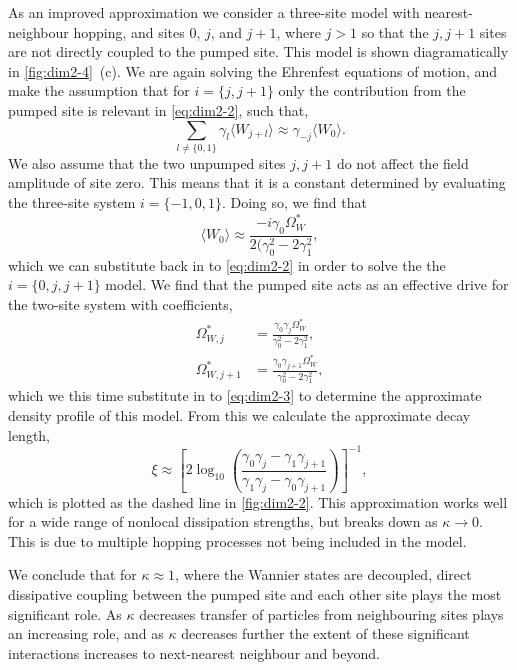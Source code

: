 As an improved approximation we consider a three-site model with nearest-neighbour hopping, and sites 0, \(j\), and \(j+1\), where \(j > 1\) so that the \(j,j+1\) sites are not directly coupled to the pumped site. This model is shown diagramatically in \cref{fig:dim2-4}~(c). We are again solving the Ehrenfest equations of motion, and make the assumption that for \(i=\{j,j+1\}\) only the contribution from the pumped site is relevant in \cref{eq:dim2-2}, such that,
\begin{equation}
	\sum_{l \neq \{0,1\}} \gamma_{l} \langle W_{j+l} \rangle \approx \gamma_{-j} \langle W_{0} \rangle.
	\label{eq:dim2-15}
\end{equation}
We also assume that the two unpumped sites \(j, j+1\) do not affect the field amplitude of site zero. This means that it is a constant determined by evaluating the three-site system \(i=\{-1,0,1\}\). Doing so, we find that
\begin{equation}
	\langle W_{0} \rangle \approx \frac{-i\gamma_{0}\Omega_{W}^{*}}{2(\gamma_{0}^{2} - 2\gamma_{1}^{2}},
	\label{eq:dim2-16}
\end{equation}
which we can substitute back in to \cref{eq:dim2-2} in order to solve the the \(i=\{0,j,j+1\}\) model. We find that the pumped site acts as an effective drive for the two-site system with coefficients,
\begin{align}
	\Omega_{W,j}^{*} &= \frac{\gamma_{0}\gamma_{j}\Omega_{W}^{*}}{\gamma_{0}^{2} - 2\gamma_{1}^{2}}, \label{eq:dim2-17} \\
	\Omega_{W,j+1}^{*} &= \frac{\gamma_{0}\gamma_{j+1}\Omega_{W}^{*}}{\gamma_{0}^{2} - 2\gamma_{1}^{2}}, \label{eq:dim2-18}
\end{align}
which we this time substitute in to \cref{eq:dim2-3} to determine the approximate density profile of this model. From this we calculate the approximate decay length,
\begin{equation}
	\xi \approx \left[ 2\log_{10}\left(\frac{\gamma_{0}\gamma_{j} - \gamma_{1}\gamma_{j+1}}{\gamma_{1}\gamma_{j} - \gamma_{0}\gamma_{j+1}}\right)\right]^{-1},
	\label{eq:dim2-19}
\end{equation}
which is plotted as the dashed line in \cref{fig:dim2-2}. This approximation works well for a wide range of nonlocal dissipation strengths, but breaks down as \(\kappa \rightarrow 0\). This is due to multiple hopping processes not being included in the model. 

We conclude that for \(\kappa \approx 1\), where the Wannier states are decoupled, direct dissipative coupling between the pumped site and each other site plays the most significant role. As \(\kappa\) decreases transfer of particles from neighbouring sites plays an increasing role, and as \(\kappa\) decreases further the extent of these significant interactions increases to next-nearest neighbour and beyond. 

